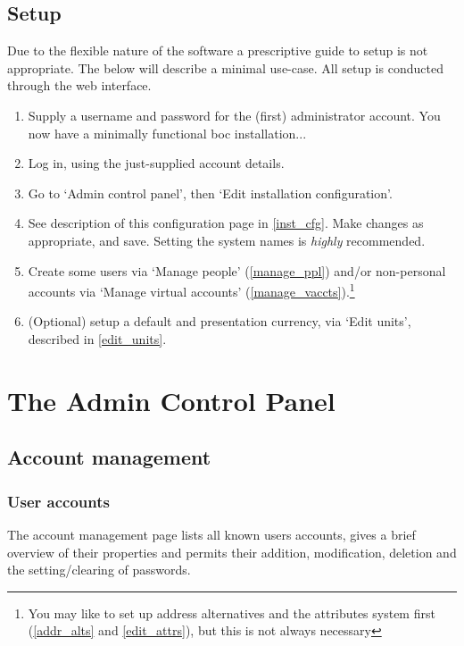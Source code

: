 \documentclass{report}
\begin{document}
\section{Setup}

Due to the flexible nature of the software a prescriptive guide to setup is not appropriate.  The below will describe a minimal use-case.  All setup is conducted through the web interface.

\begin{enumerate}
\item Supply a username and password for the (first) administrator account.  You now have a minimally functional boc installation...
\item Log in, using the just-supplied account details.
\item Go to `Admin control panel', then `Edit installation configuration'.
\item See description of this configuration page in \autoref{inst_cfg}.  Make changes as appropriate, and save.  Setting the system names is \emph{highly} recommended.
\item Create some users via `Manage people' (\autoref{manage_ppl}) and/or non-personal accounts via `Manage virtual accounts' (\autoref{manage_vaccts}).\footnote{You may like to set up address alternatives and the attributes system first (\autoref{addr_alts} and \autoref{edit_attrs}), but this is not always necessary}
\item (Optional) setup a default and presentation currency, via `Edit units', described in \autoref{edit_units}.
\end{enumerate}

\chapter{The Admin Control Panel}

\section{Account management}

\subsection{User accounts}\label{manage_ppl}

The account management page lists all known users accounts, gives a brief overview of their properties and permits their addition, modification, deletion and the setting/clearing of passwords.
\end{document}
